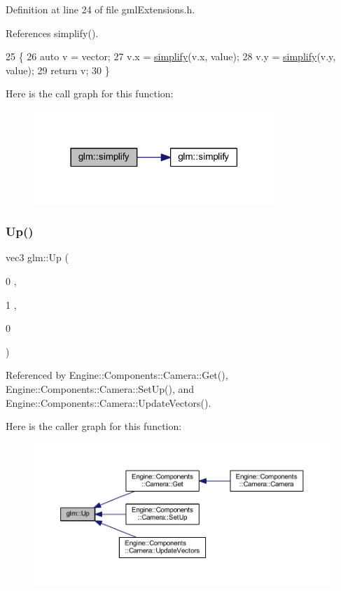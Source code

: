 Definition at line 24 of file gml\+Extensions.\+h.



References simplify().


\begin{DoxyCode}
25     \{
26         \textcolor{keyword}{auto} v = vector;
27         v.x = \mbox{\hyperlink{namespaceglm_a091978f9c1c830d7388c42251c59dad4}{simplify}}(v.x, value);
28         v.y = \mbox{\hyperlink{namespaceglm_a091978f9c1c830d7388c42251c59dad4}{simplify}}(v.y, value);
29         \textcolor{keywordflow}{return} v;
30     \}
\end{DoxyCode}
Here is the call graph for this function\+:
\nopagebreak
\begin{figure}[H]
\begin{center}
\leavevmode
\includegraphics[width=258pt]{namespaceglm_a091978f9c1c830d7388c42251c59dad4_cgraph}
\end{center}
\end{figure}
\mbox{\label{namespaceglm_a35741e27838ab920dff5fbaba619829e}} 
\subsubsection{\texorpdfstring{Up()}{Up()}}
{\footnotesize\ttfamily vec3 glm\+::\+Up (\begin{DoxyParamCaption}\item[{0}]{,  }\item[{1}]{,  }\item[{0}]{ }\end{DoxyParamCaption})}



Referenced by Engine\+::\+Components\+::\+Camera\+::\+Get(), Engine\+::\+Components\+::\+Camera\+::\+Set\+Up(), and Engine\+::\+Components\+::\+Camera\+::\+Update\+Vectors().

Here is the caller graph for this function\+:
\nopagebreak
\begin{figure}[H]
\begin{center}
\leavevmode
\includegraphics[width=350pt]{namespaceglm_a35741e27838ab920dff5fbaba619829e_icgraph}
\end{center}
\end{figure}
